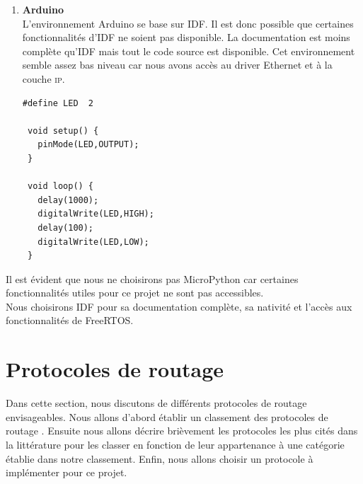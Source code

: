 \begin{enumerate}
\begin{verbatim}
            #define BLINK_GPIO CONFIG_BLINK_GPIO
            
            void app_main(void)
            {
                /*Configure the IOMUX register for pad BLINK_GPIO*/
                gpio_pad_select_gpio(BLINK_GPIO);
                /* Set the GPIO as a push/pull output */
                gpio_set_direction(BLINK_GPIO, GPIO_MODE_OUTPUT);
                while(1) {
                    /* Blink off (output low) */
                    printf("Turning off the LED\n");
                    gpio_set_level(BLINK_GPIO, 0);
                    vTaskDelay(1000 / portTICK_PERIOD_MS);
                    /* Blink on (output high) */
                printf("Turning on the LED\n");
                    gpio_set_level(BLINK_GPIO, 1);
                    vTaskDelay(1000 / portTICK_PERIOD_MS);
                }
            }
            \end{verbatim}
        \item \textbf{Arduino}\\
            L'environnement Arduino se base sur IDF. Il est donc possible que certaines
            fonctionnalités d'IDF ne soient pas disponible. 
            La documentation est moins complète qu'IDF mais tout le code source est disponible.
            Cet environnement semble assez bas niveau car nous avons accès au driver Ethernet
            et à la couche \textsc{ip}.
            \begin{verbatim}
#define LED  2
 
 void setup() {
   pinMode(LED,OUTPUT);
 }
  
 void loop() {
   delay(1000);
   digitalWrite(LED,HIGH);
   delay(100);
   digitalWrite(LED,LOW);
 }

            \end{verbatim}
    \end{enumerate}
    \vspace{1cm}
    Il est évident que nous ne choisirons pas MicroPython car certaines fonctionnalités utiles
    pour ce projet ne sont pas accessibles.\\
    Nous choisirons IDF pour sa documentation complète, sa nativité et l'accès aux
    fonctionnalités de FreeRTOS.

\section{Protocoles de routage}
    Dans cette section, nous discutons de différents protocoles de routage envisageables.
    Nous allons d'abord établir un classement des protocoles de routage \mesh.
    Ensuite nous allons décrire brièvement les protocoles les plus cités dans la littérature pour les classer
    en fonction de leur appartenance à une catégorie établie dans notre classement. 
    Enfin, nous allons choisir un protocole à implémenter pour ce projet.\\

